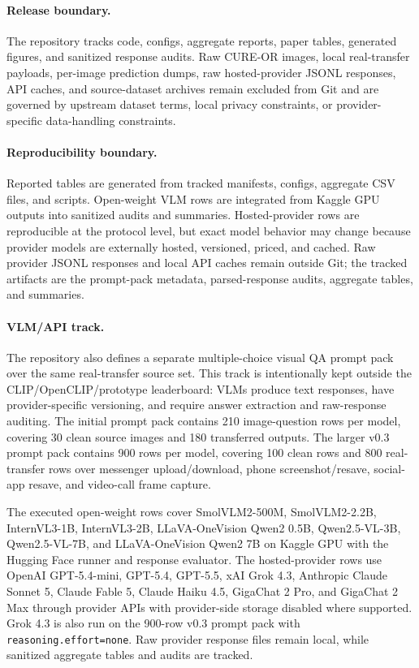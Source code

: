 \documentclass[10pt]{article}
\begin{document}
\paragraph{Release boundary.}
The repository tracks code, configs, aggregate reports, paper tables, generated figures, and sanitized response audits. Raw CURE-OR images, local real-transfer payloads, per-image prediction dumps, raw hosted-provider JSONL responses, API caches, and source-dataset archives remain excluded from Git and are governed by upstream dataset terms, local privacy constraints, or provider-specific data-handling constraints.

\paragraph{Reproducibility boundary.}
Reported tables are generated from tracked manifests, configs, aggregate CSV files, and scripts. Open-weight VLM rows are integrated from Kaggle GPU outputs into sanitized audits and summaries. Hosted-provider rows are reproducible at the protocol level, but exact model behavior may change because provider models are externally hosted, versioned, priced, and cached. Raw provider JSONL responses and local API caches remain outside Git; the tracked artifacts are the prompt-pack metadata, parsed-response audits, aggregate tables, and summaries.

\paragraph{VLM/API track.}
The repository also defines a separate multiple-choice visual QA prompt pack over the same real-transfer source set. This track is intentionally kept outside the CLIP/OpenCLIP/prototype leaderboard: VLMs produce text responses, have provider-specific versioning, and require answer extraction and raw-response auditing. The initial prompt pack contains 210 image-question rows per model, covering 30 clean source images and 180 transferred outputs. The larger v0.3 prompt pack contains 900 rows per model, covering 100 clean rows and 800 real-transfer rows over messenger upload/download, phone screenshot/resave, social-app resave, and video-call frame capture.

The executed open-weight rows cover SmolVLM2-500M, SmolVLM2-2.2B, InternVL3-1B, InternVL3-2B, LLaVA-OneVision Qwen2 0.5B, Qwen2.5-VL-3B, Qwen2.5-VL-7B, and LLaVA-OneVision Qwen2 7B on Kaggle GPU with the Hugging Face runner and response evaluator. The hosted-provider rows use OpenAI GPT-5.4-mini, GPT-5.4, GPT-5.5, xAI Grok 4.3, Anthropic Claude Sonnet 5, Claude Fable 5, Claude Haiku 4.5, GigaChat 2 Pro, and GigaChat 2 Max through provider APIs with provider-side storage disabled where supported. Grok 4.3 is also run on the 900-row v0.3 prompt pack with \texttt{reasoning.effort=none}. Raw provider response files remain local, while sanitized aggregate tables and audits are tracked.
\end{document}
